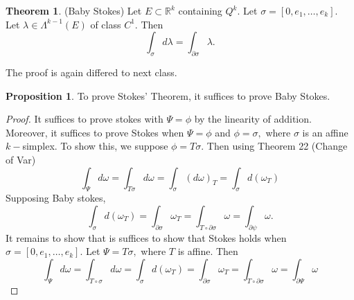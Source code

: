 \documentclass[10pt, oneside]{article}
\newcommand{\bbR}{\mathbb{R}}
\theoremstyle{definition}
\newtheorem{thm}{Theorem}
\newtheorem{prop}{Proposition}
\begin{document}
\begin{thm}
    (Baby Stokes) Let $E\subset \bbR^k$ containing $Q^k.$ Let $\sigma = [0, e_1, \dots, e_k].$ Let $\lambda \in \Lambda^{k-1}(E)$ of class $C^1.$ Then 
    \[\int_{\sigma} d\lambda = \int_{\partial \sigma} \lambda.\]
\end{thm}
The proof is again differed to next class. 

\begin{prop}
    To prove Stokes' Theorem, it suffices to prove Baby Stokes.
\end{prop}
\begin{proof}
    It suffices to prove stokes with $\Psi = \phi$ by the linearity of addition. Moreover, it suffices to prove Stokes when $\Psi = \phi$ and $\phi = \sigma,$ where $\sigma$ is an affine $k-$simplex. To show this, we suppose $\phi = T\sigma.$ Then using Theorem 22 (Change of Var)
    \[\int_\Psi d\omega = \int_{T\sigma} d\omega = \int_\sigma (d\omega)_T = \int_\sigma d(\omega_T)\] Supposing Baby stokes, 
    \[\int_\sigma d(\omega_T) = \int_{\partial \sigma} \omega_T = \int_{T\circ \partial \sigma} \omega = \int_{\partial \psi}\omega.\] It remains to show that is suffices to show that Stokes holds when $\sigma = [0, e_1, \dots, e_k].$ Let $\Psi = T \sigma,$ where $T$ is affine. Then 
    \[\int_{\Psi}d\omega = \int_{T \circ \sigma} d\omega = \int_\sigma d(\omega_T) = \int_{\partial \sigma} \omega_T = \int_{T\circ \partial \sigma}\omega = \int_{\partial \Psi}\omega\]
\end{proof}
\newpage
\end{document}
